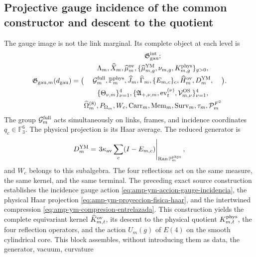 
\subsection{Projective gauge incidence of the common constructor and descent to the quotient}

The gauge image is not the link marginal. Its complete object at each level is
\begin{equation}\label{eq:pdf2-g-gau-explicito}
 \mathfrak G_{{\rm gau},m}(d_{\rm gau})=
 \bigl(
 \begin{gathered}
  \mathfrak G_{\rm gau}^{\rm int};\\
  \Lambda_m,\widehat X_m,\widehat\mu_m^{\rm ov},
  \{\widehat\mu_{m,g}^{\rm YM},\nu_{m,g},K_{m,g}^{\rm phys}\}_{g>0},\\
  \mathcal G_m^{\rm full},\mathbb P_m^{\rm phys},
  \widehat J_m,\widehat\Gamma_m,
  \{E_{m,c}\}_c,\widehat H_m^{\rm ov},D_m^{\rm YM},\\
  \{\Theta_{\nu,m}\}_{\nu=1}^4,
  \{\mathfrak A_{+,\nu,m},\operatorname{ev}_{t}^{(\nu)},
      \mathcal V_{m,\nu}^{\rm OS}\}_{\nu=1}^4,\\
  \widehat\Omega_m^{(8)},P_{\Omega_m},W_c,
  \operatorname{Carr}_m,\operatorname{Mem}_m,
  \operatorname{Surv}_m,\tau_m,\mathcal P_m^{F^2}
 \end{gathered}
 \bigr).
\end{equation}
The group $\mathcal G_m^{\rm full}$ acts simultaneously on links, frames, and
incidence coordinates $q_c\in\mathbb F_3^6$. The physical projection is its Haar
average. The reduced generator is
\begin{equation}\label{eq:pdf2-g-gau-generador-estructural}
 D_m^{\rm YM}
 =\left.3\kappa_{\rm av}\sum_c(I-E_{m,c})
  \right|_{\operatorname{Ran}\mathbb P_m^{\rm phys}},
\end{equation}
and $W_c$ belongs to this subalgebra. The four reflections act on the same
measure, the same kernel, and the same terminal.
The preceding exact source construction establishes the incidence gauge action
\eqref{eq:amp-ym-accion-gauge-incidencia}, the physical Haar projection
\eqref{eq:amp-ym-proyeccion-fisica-haar}, and the intertwined compression
\eqref{eq:amp-ym-compresion-entrelazada}. This construction yields the
complete equivariant kernel $\widehat K_{m,t}^{\rm ov}$, its descent to the
physical quotient $K_{m,t}^{\rm phys}$, the four reflection operators, and
the action $U_m(g)$ of $E(4)$ on the smooth cylindrical core. This block
assembles, without introducing them as data, the generator, vacuum, curvature
